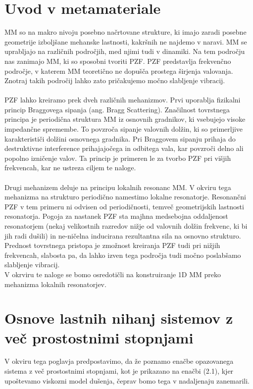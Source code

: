 \documentclass[12pt]{report}
\begin{document}
\section{Uvod v metamateriale}
\ac{MM} so na makro nivoju posebno načrtovane strukture, ki imajo zaradi posebne geometrije izboljšane
mehanske lastnosti, kakršnih ne najdemo v naravi. \ac{MM} se uprabljajo na različnih področjih,
med njimi tudi v dinamiki. Na tem področju nas zanimajo \ac{MM}, ki so sposobni tvoriti \ac{PZF}. \ac{PZF} 
predstavlja frekvenčno področje, v katerem \ac{MM} teoretično ne dopušča prostega širjenja valovanja.
Znotraj takih področij lahko zato pričakujemo močno slabljenje vibracij.
\\
\\
\ac{PZF} lahko kreiramo prek dveh različnih mehanizmov. Prvi uporablja fizikalni princip Braggovega sipanja
 (ang. Bragg Scattering). Značilnost tovrstnega principa je periodična struktura \ac{MM} iz osnovnih gradnikov,
 ki vsebujejo visoke impedančne spremembe. To povzroča sipanje valovnih dolžin, ki so primerljive karakterističi dolžini 
 osnovnega gradnika. Pri Braggovem sipanju prihaja do destruktivne interference prihajajočega in odbitega vala, kar povzroči
 delno ali popolno izničenje valov. Ta princip je primeren le za tvorbo \ac{PZF} pri višjih frekvencah, kar ne ustreza
 ciljem te naloge.
 \\
 \\
 Drugi mehanizem deluje na principu lokalnih resonanc \ac{MM}. V okviru tega mehanizma na strukturo periodično namestimo
 lokalne resonatorje. Resonančni \ac{PZF} v tem primeru ni odvisen od periodičnosti, temveč geometrijskih lastnosti resonatorja. 
 Pogoja za nastanek \ac{PZF} sta majhna medsebojna oddaljenost resonatorjem (nekaj velikostnih razredov nižje od valovnih dolžin frekvenc,
 ki bi jih radi dušili) in ne-ničelna inducirana rezultantna sila na osnovno strukturo. Prednost tovrstnega pristopa je zmožnost kreiranja
 \ac{PZF} tudi pri nižjih frekvencah, slabosta pa, da lahko izven tega področja tudi močno poslabšamo slabljenje vibracij. \cite{kosir}
 \\
V okrviru te naloge se bomo osredotičli na konstruiranje 1D \ac{MM} preko mehanizma lokalnih resonatorjev.

\section{Osnove lastnih nihanj sistemov z več prostostnimi stopnjami}
V okviru tega poglavja predpostavimo, da že poznamo enačbe opazovanega sistema z več prostostnimi stopnjami, kot je 
prikazano na enačbi (2.1), kjer upoštevamo viskozni model dušenja, čeprav bomo tega v nadaljenaju zanemarili.
\end{document}
